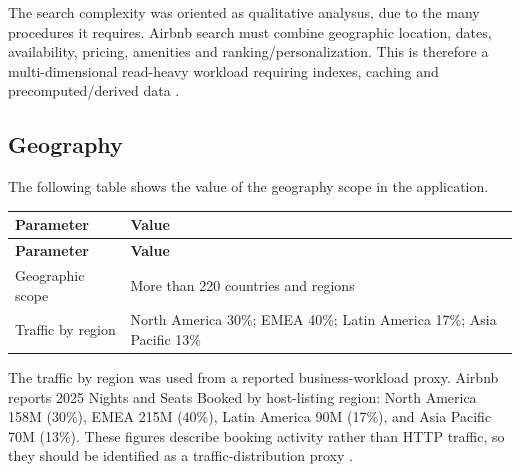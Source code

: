 The search complexity was oriented as qualitative analysus, due to the many procedures it requires. Airbnb search must 
combine geographic location, dates, availability, pricing, amenities and ranking/personalization. This is therefore 
a multi-dimensional read-heavy workload requiring indexes, caching and precomputed/derived data 
\cite{educative_airbnb_system_design}. 


\subsection{Geography}

The following table shows the value of the geography scope in the application.

\begin{longtable}{|p{}|p{}|}
    \hline
    \textbf{Parameter} & 
    \textbf{Value} \\
    \hline
    \endfirsthead

    \hline
    \textbf{Parameter} & 
    \textbf{Value} \\
    \hline
    \endhead
    
    Geographic scope & 
    More than 220 countries and regions \cite{airbnb_10k_2025} \\ 
    \hline 
    
    Traffic by region & 
    North America 30\%; EMEA 40\%; Latin America 17\%; Asia Pacific 13\% \cite{airbnb_10k_2025} \\ 
    \hline
    
\end{longtable}

The traffic by region was used from a reported business-workload proxy. Airbnb reports 2025 Nights and Seats 
Booked by host-listing region: North America 158M (30\%), EMEA 215M (40\%), Latin America 90M (17\%), and 
Asia Pacific 70M (13\%). These figures describe booking activity rather than HTTP traffic, so they should be identified
as a traffic-distribution proxy \cite{airbnb_10k_2025}.